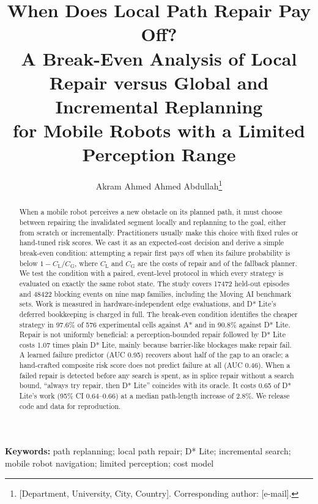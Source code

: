 \documentclass[11pt,a4paper]{article}
\title{When Does Local Path Repair Pay Off?\\[2pt]
\large A Break-Even Analysis of Local Repair versus Global and Incremental Replanning\\
for Mobile Robots with a Limited Perception Range}
\author{Akram Ahmed Ahmed Abdullah\thanks{[Department, University, City, Country]. Corresponding author: [e-mail].}}
\date{}
\newcommand{\CL}{C_{\mathrm{L}}}
\newcommand{\CG}{C_{\mathrm{G}}}
\begin{document}
\maketitle

\begin{abstract}
When a mobile robot perceives a new obstacle on its planned path, it must choose between repairing the invalidated segment locally and replanning to the goal, either from scratch or incrementally. Practitioners usually make this choice with fixed rules or hand-tuned risk scores. We cast it as an expected-cost decision and derive a simple break-even condition: attempting a repair first pays off when its failure probability is below $1-\CL/\CG$, where $\CL$ and $\CG$ are the costs of repair and of the fallback planner. We test the condition with a paired, event-level protocol in which every strategy is evaluated on exactly the same robot state. The study covers \num{17472} held-out episodes and \num{48422} blocking events on nine map families, including the Moving AI benchmark sets. Work is measured in hardware-independent edge evaluations, and D* Lite's deferred bookkeeping is charged in full. The break-even condition identifies the cheaper strategy in 97.6\% of 576 experimental cells against A* and in 90.8\% against D* Lite. Repair is not uniformly beneficial: a perception-bounded repair followed by D* Lite costs 1.07 times plain D* Lite, mainly because barrier-like blockages make repair fail. A learned failure predictor (AUC 0.95) recovers about half of the gap to an oracle; a hand-crafted composite risk score does not predict failure at all (AUC 0.46). When a failed repair is detected before any search is spent, as in splice repair without a search bound, ``always try repair, then D* Lite'' coincides with its oracle. It costs 0.65 of D* Lite's work (95\% CI 0.64--0.66) at a median path-length increase of 2.8\%. We release code and data for reproduction.
\end{abstract}

\noindent\textbf{Keywords:} path replanning; local path repair; D* Lite; incremental search; mobile robot navigation; limited perception; cost model

\end{document}
